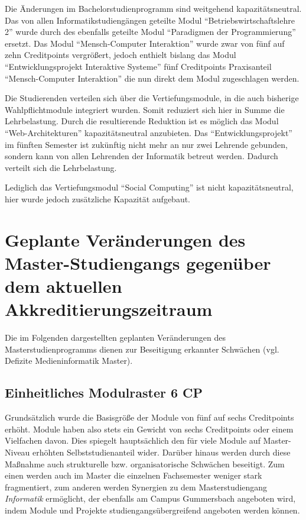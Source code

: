 Die Änderungen im Bachelorstudienprogramm sind weitgehend
kapazitätsneutral. Das von allen Informatikstudiengängen geteilte Modul
``Betriebswirtschaftslehre 2'' wurde durch des ebenfalls geteilte Modul
``Paradigmen der Programmierung'' ersetzt. Das Modul ``Mensch-Computer
Interaktion'' wurde zwar von fünf auf zehn Creditpoints vergrößert,
jedoch enthielt bislang das Modul ``Entwicklungsprojekt Interaktive
Systeme'' fünf Creditpoints Praxisanteil ``Mensch-Computer Interaktion''
die nun direkt dem Modul zugeschlagen werden.

Die Studierenden verteilen sich über die Vertiefungsmodule, in die auch
bisherige Wahlpflichtmodule integriert wurden. Somit reduziert sich hier
in Summe die Lehrbelastung. Durch die resultierende Reduktion ist es
möglich das Modul ``Web-Architekturen'' kapazitätsneutral anzubieten.
Das ``Entwicklungsprojekt'' im fünften Semester ist zukünftig nicht mehr
an nur zwei Lehrende gebunden, sondern kann von allen Lehrenden der
Informatik betreut werden. Dadurch verteilt sich die Lehrbelastung.

Lediglich das Vertiefungsmodul ``Social Computing'' ist nicht
kapazitätsneutral, hier wurde jedoch zusätzliche Kapazität aufgebaut.

\section{Geplante Veränderungen des Master-Studiengangs gegenüber dem
aktuellen
Akkreditierungszeitraum}\label{geplante-veruxe4nderungen-des-master-studiengangs-gegenuxfcber-dem-aktuellen-akkreditierungszeitraum}

Die im Folgenden dargestellten geplanten Veränderungen des
Masterstudienprogramms dienen zur Beseitigung erkannter Schwächen (vgl.
Defizite Medieninformatik Master).

\subsection{Einheitliches Modulraster 6
CP}\label{einheitliches-modulraster-6-cp}

Grundsätzlich wurde die Basisgröße der Module von fünf auf sechs
Creditpoints erhöht. Module haben also stets ein Gewicht von sechs
Creditpoints oder einem Vielfachen davon. Dies spiegelt hauptsächlich
den für viele Module auf Master-Niveau erhöhten Selbststudienanteil
wider. Darüber hinaus werden durch diese Maßnahme auch strukturelle bzw.
organisatorische Schwächen beseitigt. Zum einen werden auch im Master
die einzelnen Fachsemester weniger stark fragmentiert, zum anderen
werden Synergien zu dem Masterstudiengang \emph{Informatik} ermöglicht,
der ebenfalls am Campus Gummersbach angeboten wird, indem Module und
Projekte studiengangsübergreifend angeboten werden können.

